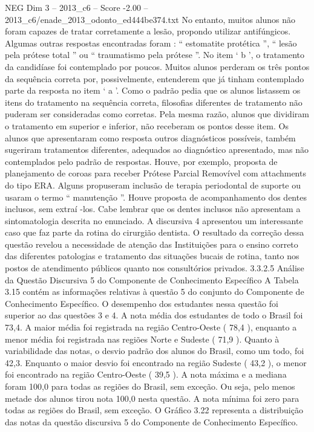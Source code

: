 \begin{textsample}{NEG Dim 3 – 2013\_c6 – Score -2.00 – 2013\_c6/enade\_2013\_odonto\_ed444be374.txt}
No entanto, muitos alunos não foram capazes de tratar corretamente a lesão, propondo utilizar antifúngicos.
Algumas outras respostas encontradas foram : “ estomatite protética ”, “ lesão pela prótese total ” ou “ traumatismo pela prótese ”.
No item ‘ b ’, o tratamento da candidíase foi contemplado por poucos.
Muitos alunos perderam os três pontos da sequência correta por, possivelmente, entenderem que já tinham contemplado parte da resposta no item ‘ a ’.
Como o padrão pedia que os alunos listassem os itens do tratamento na sequência correta, filosofias diferentes de tratamento não puderam ser consideradas como corretas.
Pela mesma razão, alunos que dividiram o tratamento em superior e inferior, não receberam os pontos desse item.
Os alunos que apresentaram como resposta outros diagnósticos possíveis, também sugeriram tratamentos diferentes, adequados ao diagnóstico apresentado, mas não contemplados pelo padrão de respostas.
Houve, por exemplo, proposta de planejamento de coroas para receber Prótese Parcial Removível com attachments do tipo ERA.
Alguns propuseram inclusão de terapia periodontal de suporte ou usaram o termo “ manutenção ”.
Houve proposta de acompanhamento dos dentes inclusos, sem extraí -los.
Cabe lembrar que os dentes inclusos não apresentam a sintomatologia descrita no enunciado.
A discursiva 4 apresentou um interessante caso que faz parte da rotina do cirurgião dentista.
O resultado da correção dessa questão revelou a necessidade de atenção das Instituições para o ensino correto das diferentes patologias e tratamento das situações bucais de rotina, tanto nos postos de atendimento públicos quanto nos consultórios privados. 3.3.2.5 Análise da Questão Discursiva 5 do Componente de Conhecimento Específico A Tabela 3.15 contém as informações relativas à questão 5 do conjunto do Componente de Conhecimento Específico.
O desempenho dos estudantes nessa questão foi superior ao das questões 3 e 4.
A nota média dos estudantes de todo o Brasil foi 73,4.
A maior média foi registrada na região Centro-Oeste ( 78,4 ), enquanto a menor média foi registrada nas regiões Norte e Sudeste ( 71,9 ).
Quanto à variabilidade das notas, o desvio padrão dos alunos do Brasil, como um todo, foi 42,3.
Enquanto o maior desvio foi encontrado na região Sudeste ( 43,2 ), o menor foi encontrado na região Centro-Oeste ( 39,5 ).
A nota máxima e a mediana foram 100,0 para todas as regiões do Brasil, sem exceção.
Ou seja, pelo menos metade dos alunos tirou nota 100,0 nesta questão.
A nota mínima foi zero para todas as regiões do Brasil, sem exceção.
O Gráfico 3.22 representa a distribuição das notas da questão discursiva 5 do Componente de Conhecimento Específico.

\end{textsample}
